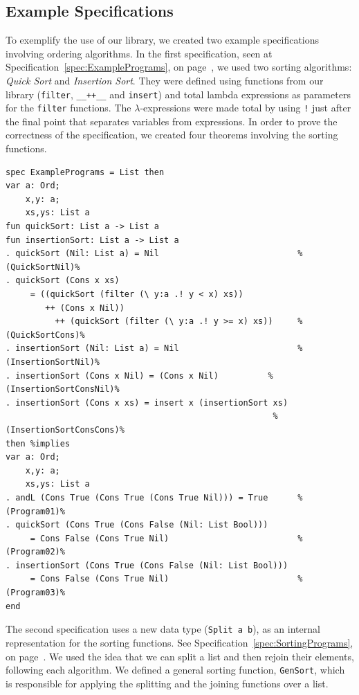 \documentclass[12pt,twoside]{article}
\numberwithin{spec}{subsection}
\numberwithin{proof}{subsection}
\numberwithin{figure}{subsection}
\numberwithin{code}{subsection}
\newcommand{\citeSpec}[1]{Specification~\ref{#1}, on page~\pageref{#1}}
\begin{document}
\subsection{Example Specifications}
To exemplify the use of our library, we created two example specifications involving ordering algorithms. In the first specification, seen at \citeSpec{spec:ExamplePrograms}, we used two sorting algorithms: \textit{Quick Sort} and \textit{Insertion Sort}. They were defined using functions from our library (\verb.filter., \verb.__++__. and \verb.insert.) and total lambda expressions as parameters for the \verb.filter. functions. The $\lambda$-expressions were made total by using \verb.!. just after the final point that separates variables from expressions. In order to prove the correctness of the specification, we created four theorems involving the sorting functions.

\begin{spec}[tb]\capstart
\begin{verbatim}
spec ExamplePrograms = List then
var a: Ord;
    x,y: a;
    xs,ys: List a
fun quickSort: List a -> List a
fun insertionSort: List a -> List a
. quickSort (Nil: List a) = Nil                            %(QuickSortNil)%
. quickSort (Cons x xs) 
     = ((quickSort (filter (\ y:a .! y < x) xs)) 
        ++ (Cons x Nil))
          ++ (quickSort (filter (\ y:a .! y >= x) xs))     %(QuickSortCons)%
. insertionSort (Nil: List a) = Nil                        %(InsertionSortNil)%
. insertionSort (Cons x Nil) = (Cons x Nil)          %(InsertionSortConsNil)%
. insertionSort (Cons x xs) = insert x (insertionSort xs)
                                                      %(InsertionSortConsCons)%
then %implies
var a: Ord;
    x,y: a;
    xs,ys: List a
. andL (Cons True (Cons True (Cons True Nil))) = True      %(Program01)%
. quickSort (Cons True (Cons False (Nil: List Bool))) 
     = Cons False (Cons True Nil)                          %(Program02)%
. insertionSort (Cons True (Cons False (Nil: List Bool))) 
     = Cons False (Cons True Nil)                          %(Program03)%
end
\end{verbatim}
\caption{ExamplePrograms Specification}
\label{spec:ExamplePrograms}
\end{spec}

The second specification uses a new data type (\verb.Split a b.), as an internal representation for the sorting functions. See \citeSpec{spec:SortingPrograms}. We used the idea that we can split a list and then rejoin their elements, following each algorithm.  We defined a general sorting function, \verb.GenSort., which is responsible for applying the splitting and the joining functions over a list.
\end{document}
